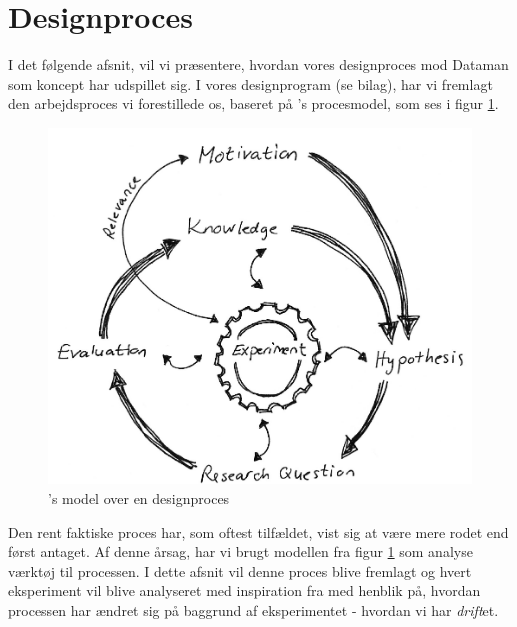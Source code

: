 \section*{Designproces}
\label{section:designproces}
I det følgende afsnit, vil vi præsentere, hvordan vores designproces mod Dataman som koncept har udspillet sig. I vores designprogram (se bilag), har vi fremlagt den arbejdsproces vi forestillede os, baseret på \cite[]{bang2012role}'s procesmodel, som ses i figur \ref{fig:procesmodel}.

\begin{figure}
    \centering
    \includegraphics[width = \textwidth]{Pictures/PetersProcesModel.png}
    \caption{\cite[]{bang2012role}'s model over en designproces}
    \label{fig:procesmodel}
\end{figure}

Den rent faktiske proces har, som oftest tilfældet, vist sig at være mere rodet end først antaget. Af denne årsag, har vi brugt modellen fra figur \ref{fig:procesmodel} som analyse værktøj til processen. I dette afsnit vil denne proces blive fremlagt og hvert eksperiment vil blive analyseret med inspiration fra \cite[]{krogh2015ways} med henblik på, hvordan processen har ændret sig på baggrund af eksperimentet - hvordan vi har \textit{drift}et.

